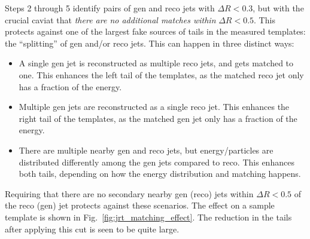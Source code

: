 Steps 2 through 5 identify pairs of gen and reco jets with $\Delta R<0.3$, but with the crucial caviat that 
\emph{there are no additional matches within} $\Delta R<0.5$. This protects against one of the largest fake sources
of tails in the measured templates: the ``splitting'' of gen and/or reco jets. This can happen in three distinct ways:
\begin{itemize}
  \item A single gen jet is reconstructed as multiple reco jets, and gets matched to one. 
  This enhances the left tail of the templates, as the matched reco jet only has a fraction of the energy.
  \item Multiple gen jets are reconstructed as a single reco jet. This enhances the right tail of the 
  templates, as the matched gen jet only has a fraction of the energy.
  \item There are multiple nearby gen and reco jets, but energy/particles are distributed differently 
  among the gen jets compared to reco. This enhances both tails, depending on how the energy distribution
  and matching happens.
\end{itemize}
Requiring that there are no secondary nearby gen (reco) jets within $\Delta R<0.5$ of the reco (gen) jet protects against these scenarios.
The effect on a sample template is shown in Fig.~\ref{fig:jrt_matching_effect}. 
The reduction in the tails after applying this cut is seen to be quite large.

